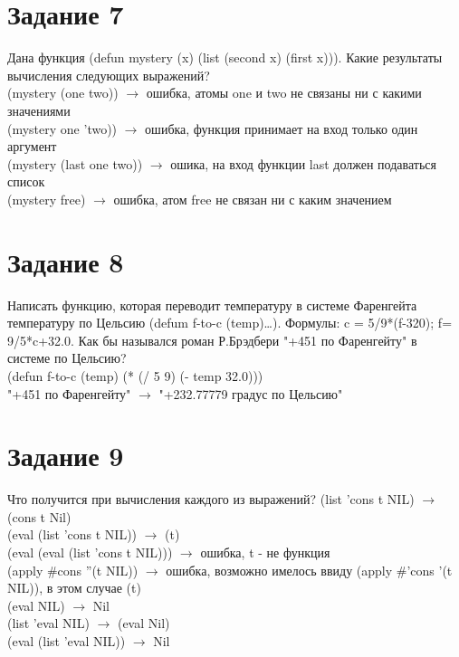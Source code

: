 \section{Задание 7}
Дана функция (defun mystery (x) (list (second x) (first x))).
Какие результаты вычисления следующих выражений?\\

(mystery (one two)) $\rightarrow$ ошибка, атомы one и two не связаны ни с какими значениями\\
(mystery one 'two)) $\rightarrow$ ошибка, функция принимает на вход только один аргумент\\
(mystery (last one two)) $\rightarrow$ ошика, на вход функции last должен подаваться список\\
(mystery free) $\rightarrow$ ошибка, атом free не связан ни с каким значением\\
\section{Задание 8}
Написать функцию, которая переводит температуру в системе Фаренгейта
температуру по Цельсию (defum f-to-c (temp)…).
Формулы: c = 5/9*(f-320); f= 9/5*c+32.0.
Как бы назывался роман Р.Брэдбери "+451 по Фаренгейту" в системе по Цельсию?\\

(defun f-to-c (temp) (* (/ 5 9) (- temp 32.0)))\\
"+451 по Фаренгейту" $\rightarrow$ "+232.77779 градус по Цельсию"
\section{Задание 9}
Что получится при вычисления каждого из выражений?
(list 'cons t NIL) $\rightarrow$ (cons t Nil)\\
(eval (list 'cons t NIL)) $\rightarrow$ (t)\\
(eval (eval (list 'cons t NIL))) $\rightarrow$ ошибка, t - не функция\\
(apply \#cons ''(t NIL)) $\rightarrow$ ошибка, возможно имелось ввиду (apply \#'cons '(t NIL)), в этом случае (t)\\
(eval NIL) $\rightarrow$ Nil\\
(list 'eval NIL) $\rightarrow$ (eval Nil)\\
(eval (list 'eval NIL)) $\rightarrow$ Nil\\